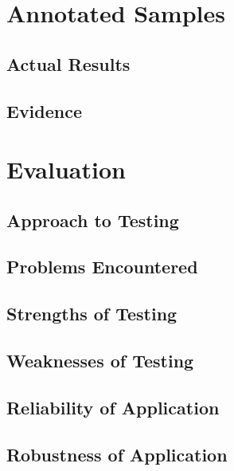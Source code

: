 \section{Annotated Samples}

\subsection{Actual Results}

\subsection{Evidence}

\section{Evaluation}

\subsection{Approach to Testing}

\subsection{Problems Encountered}

\subsection{Strengths of Testing}

\subsection{Weaknesses of Testing}

\subsection{Reliability of Application}

\subsection{Robustness of Application}